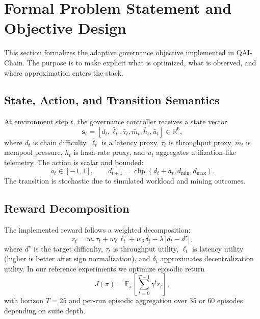\section{Formal Problem Statement and Objective Design}

This section formalizes the adaptive governance objective implemented in QAI-Chain. The purpose is to make explicit what is optimized, what is observed, and where approximation enters the stack.

\subsection{State, Action, and Transition Semantics}

At environment step $t$, the governance controller receives a state vector
\begin{equation}
\mathbf{s}_t = [d_t, \bar{\ell}_t, \bar{\tau}_t, \bar{m}_t, \bar{h}_t, \bar{u}_t] \in \mathbb{R}^6,
\end{equation}
where $d_t$ is chain difficulty, $\bar{\ell}_t$ is a latency proxy, $\bar{\tau}_t$ is throughput proxy, $\bar{m}_t$ is mempool pressure, $\bar{h}_t$ is hash-rate proxy, and $\bar{u}_t$ aggregates utilization-like telemetry. The action is scalar and bounded:
\begin{equation}
a_t \in [-1, 1], \qquad d_{t+1} = \operatorname{clip}(d_t + a_t, d_{\min}, d_{\max}).
\end{equation}
The transition is stochastic due to simulated workload and mining outcomes.

\subsection{Reward Decomposition}

The implemented reward follows a weighted decomposition:
\begin{equation}
r_t = w_{\tau}\,\tau_t + w_{\ell}\,\ell_t + w_{\delta}\,\delta_t - \lambda\,|d_t - d^\star|,
\end{equation}
where $d^\star$ is the target difficulty, $\tau_t$ is throughput utility, $\ell_t$ is latency utility (higher is better after sign normalization), and $\delta_t$ approximates decentralization utility. In our reference experiments we optimize episodic return
\begin{equation}
J(\pi) = \mathbb{E}_{\pi}\left[\sum_{t=0}^{T-1} \gamma^t r_t\right],
\end{equation}
with horizon $T=25$ and per-run episodic aggregation over 35 or 60 episodes depending on suite depth.

